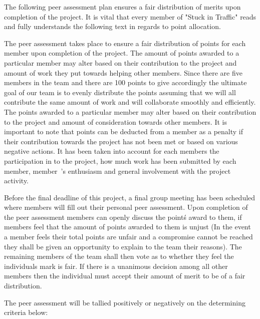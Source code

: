 \documentclass[oneside]{article}
\begin{document}
The following peer assessment plan ensures a fair distribution of merits upon completion of the project. It is vital that every member of "Stuck in Traffic" reads and fully understands the following text in regards to point allocation.
\newline

\noindent 
The peer assessment takes place to ensure a fair distribution of points for each member upon completion of the project. The amount of points awarded to a particular member may alter based on their contribution to the project and amount of work they put towards helping other members. Since there are five members in the team and there are 100 points to give accordingly the ultimate goal of our team is to evenly distribute the points assuming that we will all contribute the same amount of work and will collaborate smoothly and efficiently.
The points awarded to a particular member may alter based on their contribution to the project and amount of consideration towards other members. It is important to note that points can be deducted from a member as a penalty if their contribution towards the project has not been met or based on various negative actions. 
It has been taken into account for each members the participation in to the project, how much work has been submitted by each member, member\ 's enthusiasm and general involvement with the project activity.
\newline

\noindent Before the final deadline of this project, a final group meeting has been scheduled where members will fill out their personal peer assessment. Upon completion of the peer assessment members can openly discuss the point\'s award to them, if members feel that the amount of points awarded to them is unjust (In the event a member feels their total points are unfair and a compromise cannot be reached they shall be given an opportunity to explain to the team their reasons). The remaining members of the team shall then vote as to whether they feel the individuals mark is fair. If there is a unanimous decision among all other members then the individual must accept their amount of merit to be of a fair distribution. 
\newline

\noindent The peer assessment will be tallied positively or negatively on the determining criteria below:
\end{document}
